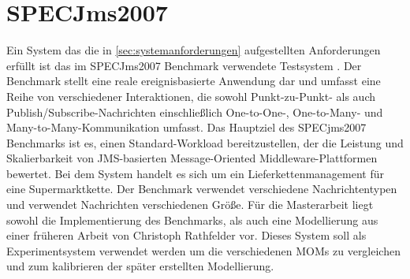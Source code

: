 \section{SPECJms2007}
Ein System das die in \autoref{sec:systemanforderungen} aufgestellten Anforderungen erfüllt ist das im SPECJms2007 Benchmark verwendete Testsystem \cite{Sachs2013}. Der Benchmark stellt eine reale ereignisbasierte Anwendung dar und umfasst eine Reihe von verschiedener Interaktionen, die sowohl Punkt-zu-Punkt- als auch Publish/Subscribe-Nachrichten einschließlich One-to-One-, One-to-Many- und Many-to-Many-Kommunikation umfasst. Das Hauptziel des SPECjms2007 Benchmarks ist es, einen Standard-Workload bereitzustellen, der die Leistung und Skalierbarkeit von JMS-basierten Message-Oriented Middleware-Plattformen bewertet. Bei dem System handelt es sich um ein Lieferkettenmanagement für eine Supermarktkette. Der Benchmark verwendet verschiedene Nachrichtentypen und verwendet Nachrichten verschiedenen Größe. Für die Masterarbeit liegt sowohl die Implementierung des Benchmarks, als auch eine Modellierung aus einer früheren Arbeit von Christoph Rathfelder \cite{Rathfelder2013} vor. Dieses System soll als Experimentsystem verwendet werden um die verschiedenen MOMs zu vergleichen und zum kalibrieren der später erstellten Modellierung. 


